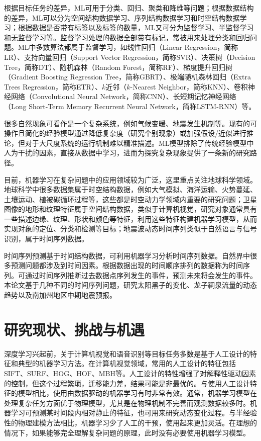 根据目标任务的差异，ML可用于分类、回归、聚类和降维等问题；根据数据结构的差异，ML可以分为空间结构数据学习、序列结构数据学习和时空结构数据学习；根据数据是否带有标签以及标签的数量，ML又可分为监督学习、半监督学习和无监督学习等。监督学习处理的数据全部带有标记，常被用来处理分类和回归问题。ML中多数算法都属于监督学习，如线性回归（Linear Regression，简称LR）、支持向量回归（Support Vector Regression，简称SVR）、决策树（Decision Tree，简称DT）、随机森林（Random Forest，简称RF）、梯度提升回归树（Gradient Boosting Regression Tree，简称GBRT）、极端随机森林回归（Extra Trees Regression，简称ETR）、$k$近邻（$k$-Nearest Neighbor，简称KNN）、卷积神经网络（Convolutional Neural Network，简称CNN）、长短期记忆神经网络（Long Short-Term Memory Recurrent Neural Network，简称LSTM-RNN）等。

很多自然现象可看作是一个复杂系统，例如气候变暖、地震发生机制等\citep{fan2021statistical}。现有的可操作且简化的经验模型通过降低复杂度（研究个别现象）或加强假设/近似进行推论，但对于大尺度系统的运行机制难以精准描述。ML模型排除了传统经验模型中人为干扰的因素，直接从数据中学习，进而为探究复杂现象提供了一条新的研究路径。

目前，机器学习在复杂问题中的应用领域较为广泛，这里重点关注地球科学领域。地球科学中很多数据集属于时空结构数据，例如大气模拟、海洋运输、火势蔓延、土壤运动、植被碳循环过程等，这些都是时空动力学领域内重要的研究问题\citep{mathieu2015deep,oh2015action}；卫星图像的地形和纹理特征属于空间结构数据，类似于计算机视觉，研究对象通常具有一些描述边缘、纹理、形状和颜色等特征，利用这些特征构建机器学习模型，从而实现对象的定位、分类和检测等目标\citep{lee1990neural}；地震波动态时间序列类似于自然语言与信号识别，属于时间序列数据\citep{rouet2017machine,perol2018convolutional,devries2018deep}。

时间序列预测基于时间结构数据，可利用机器学习分析时间序列数据。自然界中很多预测问题都涉及到时间因素。根据数据出现的时间顺序排列的数据称为时间序列。可通过时间序列推断过去数据点序列发生的事件，预测未来将会发生的事件。本论文基于几种不同的时间序列问题，研究太阳黑子的变化、龙子祠泉流量的动态趋势以及南加州地区中期地震预报。

\section{研究现状、挑战与机遇}\label{sec:intro_veiw}

深度学习兴起前，关于计算机视觉和语音识别等目标任务多数是基于人工设计的特征和典型的机器学习方法。在计算机视觉领域，常用的人工设计的特征包括SIFT、SURF、HOG、HOF、MBH等。人工设计的特性增强了对解释性驱动因素的控制，但这个过程繁琐，迁移能力差，结果可能是非最优的。与使用人工设计特征的模型相比，使用由数据驱动的机器学习有时非常有效。通常，机器学习模型在处理复杂任务方面优于物理模型，尤其是在物理机制不完善而观测数据较多时。机器学习可预测某时间段内相对静止的特征，也可用来研究动态变化过程。与半经验性的物理建模方法相比，机器学习少了人工的干预，使用起来更加灵活。在理想的情况下，如果能够完全理解复杂问题的原理，此时没有必要使用机器学习模型。

